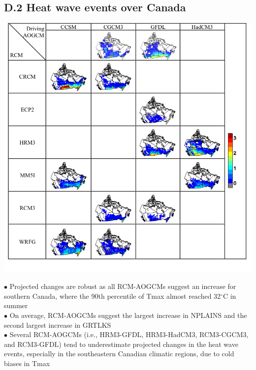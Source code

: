 \documentclass[a0,landscape]{a0poster}
\newcommand{\vspacebetweenbullets}{0.25cm}
\begin{document}
\begin{multicols*}{4}
\subsection*{D.2 Heat wave events over Canada \citep{jeong2016heatwave}}
\begin{center}
\includegraphics[width=0.6\linewidth]{cc_heatwaves}
\end{center}
$\bullet$ Projected changes are robust as all RCM-AOGCMs suggest an increase for southern Canada, where the 90th percentile of Tmax almost reached 32$^\circ$C in summer \\[\vspacebetweenbullets]
$\bullet$ On average, RCM-AOGCMs suggest the largest increase in NPLAINS and the second largest increase in GRTLKS \\[\vspacebetweenbullets]
$\bullet$ Several RCM-AOGCMs (i.e., HRM3-GFDL, HRM3-HadCM3, RCM3-CGCM3, and RCM3-GFDL)
      tend to underestimate projected changes in the heat wave events, especially in
      the southeastern Canadian climatic regions, due to cold biases in Tmax


\end{multicols*}
\end{document}
